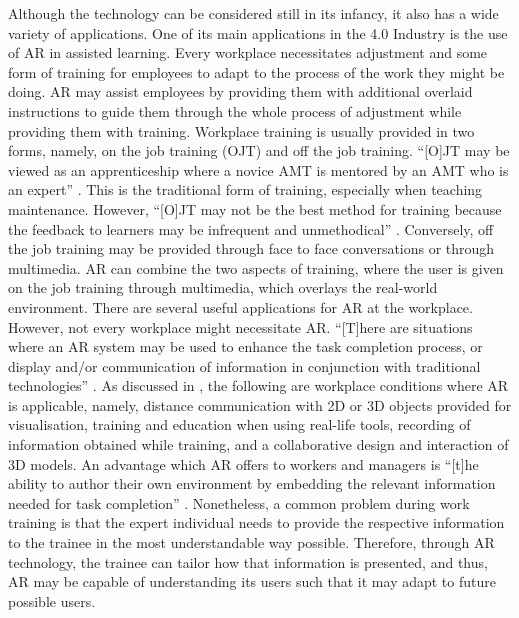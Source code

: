 \documentclass{aifyp}
\begin{document}
\indent Although the technology can be considered still in its infancy, it also has a wide variety of applications. One of its main applications in the 4.0 Industry is the use of AR in assisted learning. Every workplace necessitates adjustment and some form of training for employees to adapt to the process of the work they might be doing. AR may assist employees by providing them with additional overlaid instructions to guide them through the whole process of adjustment while providing them with training.
\newline
\newline
\indent Workplace training is usually provided in two forms, namely, on the job training (OJT) and off the job training. “[O]JT may be viewed as an apprenticeship where a novice AMT is mentored by an AMT who is an expert” \cite{1563376}. This is the traditional form of training, especially when teaching maintenance. However, “[O]JT may not be the best method for training because the feedback to learners may be infrequent and unmethodical” \cite{1563376}. Conversely, off the job training may be provided through face to face conversations or through multimedia. AR can combine the two aspects of training, where the user is given on the job training through multimedia, which overlays the real-world environment.
\newline
\newline
\indent There are several useful applications for AR at the workplace. However, not every workplace might necessitate AR. “[T]here are situations where an AR system may be used to enhance the task completion process, or display and/or communication of information in conjunction with traditional technologies” \cite{ARInfoForWorkplace}. As discussed in \cite{ARInfoForWorkplace}, the following are workplace conditions where AR is applicable, namely, distance communication with 2D or 3D objects provided for visualisation, training and education when using real-life tools, recording of information obtained while training, and a collaborative design and interaction of 3D models.
\newline
\newline
\indent An advantage which AR offers to workers and managers is “[t]he ability to author their own environment by embedding the relevant information needed for task completion” \cite{ARInfoForWorkplace}. Nonetheless, a common problem during work training is that the expert individual needs to provide the respective information to the trainee in the most understandable way possible. Therefore, through AR technology, the trainee can tailor how that information is presented, and thus, AR may be capable of understanding its users such that it may adapt to future possible users.
\end{document}
